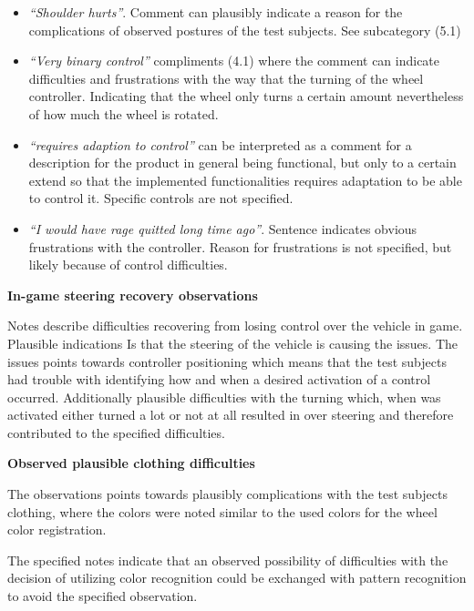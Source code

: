 \begin{itemize}
\item[] \textit{“Shoulder hurts”}. Comment can plausibly indicate a reason for the complications of observed postures of the test subjects. See subcategory ({\color{Red}5.1}) 

\item[] \textit{“Very binary control”} compliments ({\color{Red}4.1}) where the comment can indicate difficulties and frustrations with the way that the turning of the wheel controller. 
Indicating that the wheel only turns a certain amount nevertheless of how much the wheel is rotated.

\item[] \textit{“requires adaption to control”} can be interpreted as a comment for a description for the product in general being functional, but only to a certain extend so that the implemented functionalities requires adaptation to be able to control it. Specific controls are not specified.

\item[] \textit{“I would have rage quitted long time ago”}. Sentence indicates obvious frustrations with the controller. Reason for frustrations is not specified, but likely because of control difficulties.
\end{itemize}
\bigskip

\noindent \textbf{In-game steering recovery observations}\newline

Notes describe difficulties recovering from losing control over the vehicle in game. 
Plausible indications Is that the steering of the vehicle is causing the issues. 
The issues points towards controller positioning which means that the test subjects had trouble with identifying how and when a desired activation of a control occurred. 
Additionally plausible difficulties with the turning which, when was activated either turned a lot or not at all resulted in over steering and therefore contributed to the specified difficulties.  
\bigskip

\noindent \textbf{Observed plausible clothing difficulties}\newline


The observations points towards plausibly complications with the test subjects clothing, where the colors were noted similar to the used colors for the wheel color registration. 
\bigskip

The specified notes indicate that an observed possibility of difficulties with the decision of utilizing color recognition could be exchanged with pattern recognition to avoid the specified observation.
\bigskip

